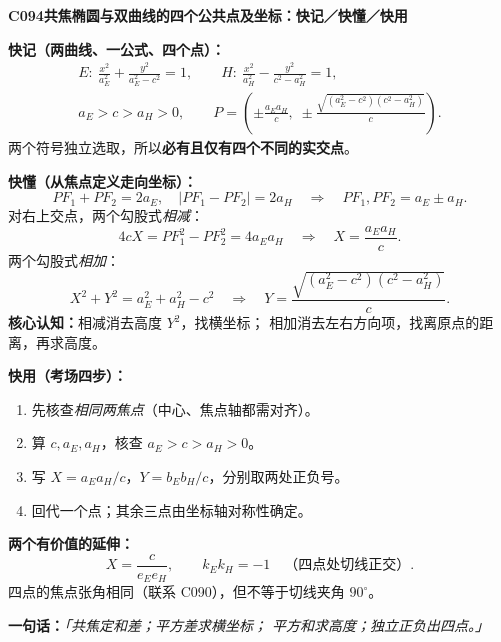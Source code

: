 \clearpage
\begin{summarybox}
\textbf{C094\quad 共焦椭圆与双曲线的四个公共点及坐标：快记／快懂／快用}

\textbf{快记（两曲线、一公式、四个点）：}
\[
\begin{gathered}
E:\ \frac{x^2}{a_E^2}+\frac{y^2}{a_E^2-c^2}=1,\qquad
H:\ \frac{x^2}{a_H^2}-\frac{y^2}{c^2-a_H^2}=1,\\[-1pt]
a_E>c>a_H>0,\qquad
\boxed{P=\left(\pm\frac{a_Ea_H}{c},\;
\pm\frac{\sqrt{(a_E^2-c^2)(c^2-a_H^2)}}{c}\right)}.
\end{gathered}
\]
两个符号独立选取，所以\textbf{必有且仅有四个不同的实交点}。

\textbf{快懂（从焦点定义走向坐标）：}
\[
PF_1+PF_2=2a_E,\quad |PF_1-PF_2|=2a_H
\quad\Longrightarrow\quad PF_1,PF_2=a_E\pm a_H.
\]
对右上交点，两个勾股式\emph{相减}：
\[
4cX=PF_1^2-PF_2^2=4a_Ea_H
\quad\Longrightarrow\quad X=\frac{a_Ea_H}{c}.
\]
两个勾股式\emph{相加}：
\[
X^2+Y^2=a_E^2+a_H^2-c^2
\quad\Longrightarrow\quad
Y=\frac{\sqrt{(a_E^2-c^2)(c^2-a_H^2)}}c.
\]
\textbf{核心认知：}相减消去高度 $Y^2$，找横坐标；
相加消去左右方向项，找离原点的距离，再求高度。

\textbf{快用（考场四步）：}
\begin{enumerate}
\item 先核查\emph{相同两焦点}（中心、焦点轴都需对齐）。
\item 算 $c,a_E,a_H$，核查 $a_E>c>a_H>0$。
\item 写 $X=a_Ea_H/c$，$Y=b_Eb_H/c$，分别取两处正负号。
\item 回代一个点；其余三点由坐标轴对称性确定。
\end{enumerate}

\textbf{两个有价值的延伸：}
\[
\boxed{X=\frac{c}{e_Ee_H}},\qquad
\boxed{k_Ek_H=-1\quad\text{（四点处切线正交）}}.
\]
四点的焦点张角相同（联系 C090），但不等于切线夹角 $90^\circ$。

\textbf{一句话：}\emph{「共焦定和差；平方差求横坐标；
平方和求高度；独立正负出四点。」}
\end{summarybox}
